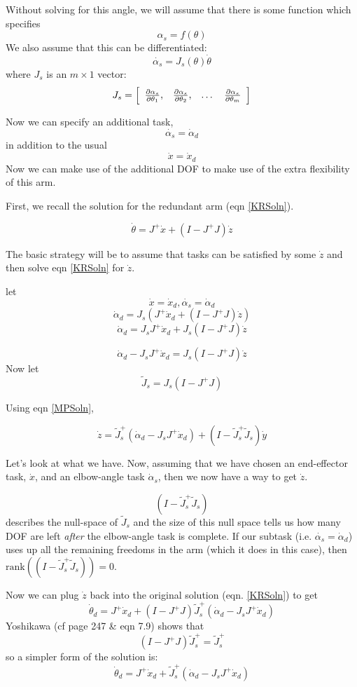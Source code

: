 Without solving for this angle, we will assume that there is some
function which specifies
\[
\alpha_s = f(\theta)
\]
We also assume that this can be differentiated:
\[
\dot{\alpha_s} = J_s(\theta) \dot{\theta}
\]
where $J_s$ is an $m \times 1$ vector:
\[
J_s = \left [
\begin{array}{cccc}
\frac{\partial \alpha_s}{\partial \theta_1}, &
\frac{\partial \alpha_s}{\partial \theta_2}, &
\dots &
\frac{\partial \alpha_s}{\partial \theta_m}
\end{array}
\right ]
\]

Now we can specify an additional   task,
\[
\dot{\alpha_s} = \dot{\alpha}_d
\]
in addition to the usual
\[
\dot{x} = \dot{x}_d
\]
Now we can make use of the additional DOF to make use of the extra
flexibility of this arm.

First, we recall the solution for the redundant arm (eqn \ref{KRSoln}).

\[
\dot{\theta} = J^{+}\dot{x} + (I-J^{+}J)\dot{z}
\]

The basic strategy will be to assume that tasks can be satisfied by
some $\dot{z}$ and then solve  eqn \ref{KRSoln} for  $\dot{z}$.

let
\[
\dot{x} = \dot{x}_d,  \dot{\alpha_s} = \dot{\alpha}_d
\]
\[
\dot{\alpha}_d = J_s ( J^{+}\dot{x}_d + (I-J^{+}J)\dot{z})
\]
\[
\dot{\alpha}_d = J_s J^{+}\dot{x}_d + J_s(I-J^{+}J)\dot{z}
\]

\[
\dot{\alpha}_d - J_s J^{+}\dot{x}_d = J_s(I-J^{+}J)\dot{z}
\]
Now let
\[
\tilde{J}_s = J_s(I-J^{+}J)
\]

Using eqn \ref{MPSoln},

\[
\dot{z} = \tilde{J}_s^{+}(\dot{\alpha}_d - J_s J^{+}\dot{x}_d) +
(I-\tilde{J}_s^{+}\tilde{J}_s)\dot{y}
\]

Let's look at what we have.   Now, assuming that we have chosen
an end-effector task, $\dot{x}$, and an elbow-angle task
$\dot{\alpha}_s$, then we now have a way to get $\dot{z}$.

\[
(I-\tilde{J}_s^{+}\tilde{J}_s)
\]
describes the null-space of $\tilde{J}_s$ and the size of this null
space tells us how many DOF are left {\it after} the elbow-angle task is 
complete.
If our subtask (i.e.  $\dot{\alpha_s} = \dot{\alpha}_d$) uses
up all the remaining freedoms in the arm (which it does in this case),
then   $\mathrm{rank}((I-\tilde{J}_s^{+}\tilde{J}_s))=0$.

Now we can plug $\dot{z}$
back into the original solution (eqn. \ref{KRSoln}) to get
\[
\dot{\theta}_d = J^{+}\dot{x}_d +
(I-J^{+}J)\tilde{J}_s^{+}(\dot{\alpha}_d-J_sJ^{+}\dot{x}_d)
\]
Yoshikawa (cf page 247 \& eqn 7.9)
shows that
\[
(I-J^{+}J)\tilde{J}_s^{+} =  \tilde{J}_s^{+}
\]
so a simpler form of the solution is:
\[
\dot{\theta}_d = J^{+}\dot{x}_d +
\tilde{J}_s^{+}(\dot{\alpha}_d-J_sJ^{+}\dot{x}_d)
\]

